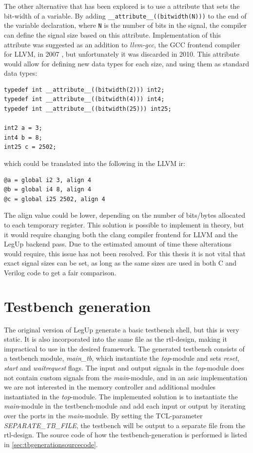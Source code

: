 The other alternative that has been explored is to use a attribute that sets the bit-width of a variable. By adding \verb!__attribute__((bitwidth(N)))! to the end of the variable declaration, where \verb!N! is the number of bits in the signal, the compiler can define the signal size based on this attribute. Implementation of this attribute was suggested as an addition to \textit{llvm-gcc}, the GCC frontend compiler for LLVM, in 2007 \cite{bitwidthattr}, but unfortunately it was discarded in 2010. This attribute would allow for defining new data types for each size, and using them as standard data types:
\begin{lstlisting}
typedef int __attribute__((bitwidth(2))) int2;
typedef int __attribute__((bitwidth(4))) int4;
typedef int __attribute__((bitwidth(25))) int25;

int2 a = 3;
int4 b = 8;
int25 c = 2502;
\end{lstlisting}
which could be translated into the following in the LLVM \gls{ir}:
\begin{lstlisting}
@a = global i2 3, align 4
@b = global i4 8, align 4
@c = global i25 2502, align 4
\end{lstlisting}
The align value could be lower, depending on the number of bits/bytes allocated to each temporary register. This solution is possible to implement in theory, but it would require changing both the clang compiler frontend for LLVM and the LegUp backend pass. Due to the estimated amount of time these alterations would require, this issue has not been resolved. For this thesis it is not vital that exact signal sizes can be set, as long as the same sizes are used in both C and Verilog code to get a fair comparison.

\section{\label{subsec:tbgen}Testbench generation}
The original version of LegUp generate a basic testbench shell, but this is very static. It is also incorporated into the same file as the \gls{rtl}-design, making it impractical to use in the desired framework. The generated testbench consists of a testbench module, \textit{main\_tb}, which instantiate the \textit{top}-module and sets \textit{reset}, \textit{start} and \textit{waitrequest} flags. The input and output signals in the \textit{top}-module does not contain custom signals from the \textit{main}-module, and in an \gls{asic} implementation we are not interested in the memory controller and additional modules instantiated in the \textit{top}-module. The implemented solution is to instantiate the \textit{main}-module in the testbench-module and add each input or output by iterating over the ports in the \textit{main}-module. By setting the TCL-parameter \textit{SEPARATE\_TB\_FILE}, the testbench will be output to a separate file from the \gls{rtl}-design. The source code of how the testbench-generation is performed is listed in \cref{sec:tbgenerationsourcecode}.

